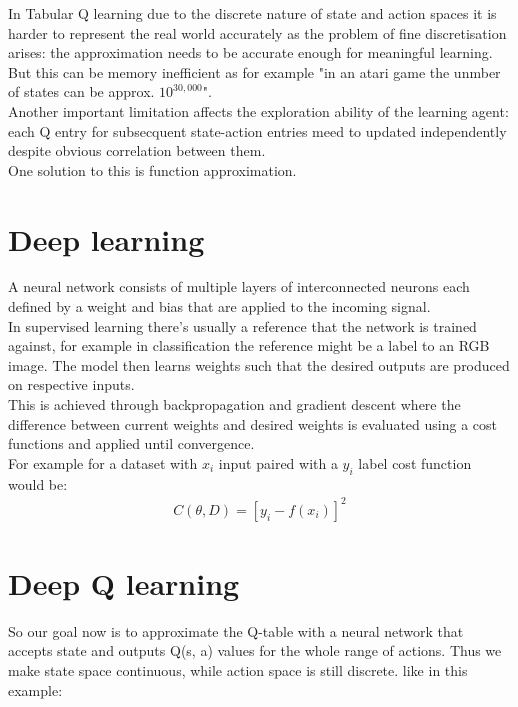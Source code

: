 In Tabular Q learning due to the discrete nature of 
state and action spaces it is harder to represent the real world accurately as the problem of fine discretisation arises: the approximation needs to be accurate enough for meaningful learning. But this can be memory inefficient as for example "in an atari game the unmber of states can be  approx. $10^{30,000}$". \\

Another important limitation affects the exploration ability of the learning agent: each Q entry for subsecquent state-action entries meed to updated independently despite obvious correlation between them.\\

One solution to this is function approximation.

\section{Deep learning}

A neural network consists of multiple layers of interconnected neurons each defined by a weight and bias that are applied to the incoming signal.\\

In supervised learning there's usually a reference that 
the network is trained against, for example in classification the reference might be a label to an RGB image. The model then learns weights such that the desired outputs are produced on respective inputs. \\

This is achieved through backpropagation and gradient descent where the difference between current weights and desired weights is evaluated using a cost functions and applied until convergence.\\

For example for a dataset with $x_i$ input paired with a $y_i$ label cost function would be: 
\begin{align}
    C(\theta, D) = [y_i - f(x_i)]^2
\end{align}

\section{Deep Q learning}

So our goal now is to approximate the Q-table with a neural network that accepts state and outputs Q(s, a) 
values for the whole range of actions. Thus we make state space continuous, while action space is still discrete. like in this example:

